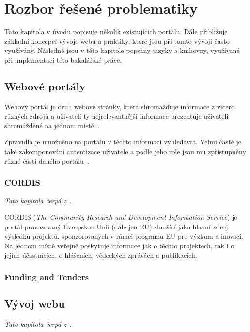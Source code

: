 \chapter{Rozbor řešené problematiky}
Tato kapitola v úvodu popisuje několik existujících portálu. Dále přibližuje základní koncepcí vývoje webu a praktiky, které jsou při tomto vývoji často využívány. Následně jsou v této kapitole popsány jazyky a knihovny, využívané při implementaci této bakalářské práce.

\section{Webové portály}
Webový portál je druh webové stránky, která shromažďuje informace z vícero různých zdrojů a uživateli ty nejrelevantnější informace prezentuje uživateli shromážděné na jednom místě~\cite{bib:portal-liferay}.

Zpravidla je umožněno na portálu v těchto informací vyhledávat. Velmi časté je také zakomponování autentizace uživatele a podle jeho role jsou mu zpřístupněny různé části daného portálu~\cite{bib:portal-indiana}.

\blindtext[2]

\subsection{CORDIS}
\emph{Tato kapitola čerpá z~\cite{bib:cordis}}.

CORDIS (\emph{The Community Research and Development Information Service}) je portál provozovaný Evropskou Unií (dále jen EU) sloužící jako hlavní zdroj výsledků projektů, sponzorovaných v rámci programů EU pro výzkum a inovaci. Na jednom místě veřejně poskytuje informace jak o těchto projektech, tak i o jejích účastnících, o hlášeních, vědeckých zprávách a publikacích.
\blindtext

\subsection{Funding and Tenders}
\blindtext



\section{Vývoj webu}
\emph{Tato kapitola čerpá z~\cite{bib:web-development}}.


